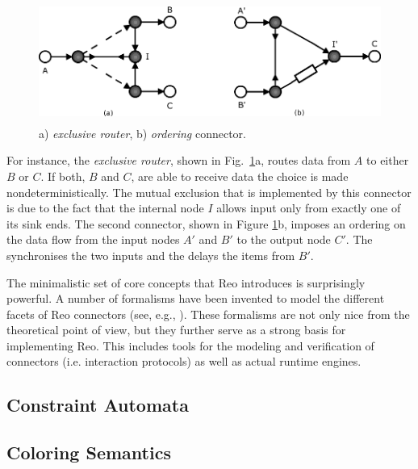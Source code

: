 \begin{figure}[ht]
	\begin{center}
	\includegraphics[height=4cm]{images/router-ordering}
	\end{center}
\caption{a) \emph{exclusive router}, b) \emph{ordering} connector.}
\label{fig:router-ordering}
\end{figure}

For instance, the \emph{exclusive router}, shown in
Fig.~\ref{fig:router-ordering}a, routes data from $A$ to either $B$ or $C$.
If both, $B$ and $C$, are able to receive data the choice is made
nondeterministically. The mutual exclusion that is implemented by this connector
is due to the fact that the internal node $I$ allows input only from exactly
one of its sink ends. The second connector, shown in Figure
\ref{fig:router-ordering}b, imposes an ordering on the data flow from the
input nodes $A'$ and $B'$ to the output node $C'$. The \SyncDrain synchronises
the two inputs and the \FIFO delays the items from $B'$.

The minimalistic set of core concepts that Reo introduces is surprisingly
powerful. A number of formalisms have been invented to model the
different facets of Reo connectors (see, e.g., \cite{ABRS03,AR02,CCA05}). 
These formalisms are not only nice from the theoretical point of
view, but they further serve as a strong basis for implementing
Reo. This includes tools for the modeling and verification of connectors 
(i.e. interaction protocols) as well as actual runtime engines.


\subsection{Constraint Automata}
\label{sec:constraint-automata}

\subsection{Coloring Semantics}
\label{sec:coloring-semantics}

